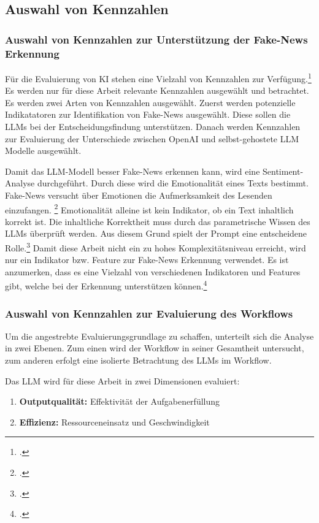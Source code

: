 \documentclass[12pt,a4paper]{article}
\begin{document}
    \subsection{Auswahl von Kennzahlen}

    \subsubsection{Auswahl von Kennzahlen zur Unterstützung der Fake-News Erkennung}
    Für die Evaluierung von KI stehen eine Vielzahl von Kennzahlen zur Verfügung.\footnote{\cite[S.6062]{KennzahlenAiAgents}.}
    Es werden nur für diese Arbeit relevante Kennzahlen ausgewählt und betrachtet. Es werden zwei Arten von Kennzahlen
    ausgewählt. Zuerst werden potenzielle Indikatatoren zur Identifikation von Fake-News ausgewählt. Diese sollen die
    LLMs bei der Entscheidungsfindung unterstützen. Danach werden Kennzahlen zur Evaluierung der Unterschiede zwischen
    OpenAI und selbst-gehostete LLM Modelle ausgewählt.

    Damit das LLM-Modell besser Fake-News erkennen kann, wird eine Sentiment-Analyse durchgeführt. Durch diese wird die
    Emotionalität eines Texts bestimmt. Fake-News versucht über Emotionen die Aufmerksamkeit des Lesenden einzufangen. \footcite{ghanem-etal-2021-fakeflow}
    Emotionalität alleine ist kein Indikator, ob ein Text inhaltlich korrekt ist. Die inhaltliche Korrektheit muss
    durch das parametrische Wissen des LLMs überprüft werden. Aus diesem Grund spielt der Prompt eine entscheidene Rolle.\footcite{Prompt}
    Damit diese Arbeit nicht ein zu hohes Komplexitätsniveau erreicht, wird nur ein Indikator bzw. Feature zur Fake-News Erkennung
    verwendet. Es ist anzumerken, dass es eine Vielzahl von verschiedenen Indikatoren und Features gibt, welche bei der
    Erkennung unterstützen können.\footnote{\cite{FakeNewsDetectionDataMining}.}

    \subsubsection{Auswahl von Kennzahlen zur Evaluierung des Workflows} \label{chap:Metrics}
    Um die angestrebte Evaluierungsgrundlage zu schaffen, unterteilt sich die Analyse in zwei Ebenen.
    Zum einen wird der Workflow in seiner Gesamtheit untersucht, zum anderen erfolgt eine isolierte Betrachtung
    des LLMs im Workflow.

    Das LLM wird für diese Arbeit in zwei Dimensionen evaluiert:
    \begin{enumerate}
        \item \textbf{Outputqualität:}
        Effektivität der Aufgabenerfüllung
        \item \textbf{Effizienz:}
        Ressourceneinsatz und Geschwindigkeit
    \end{enumerate}
\end{document}
